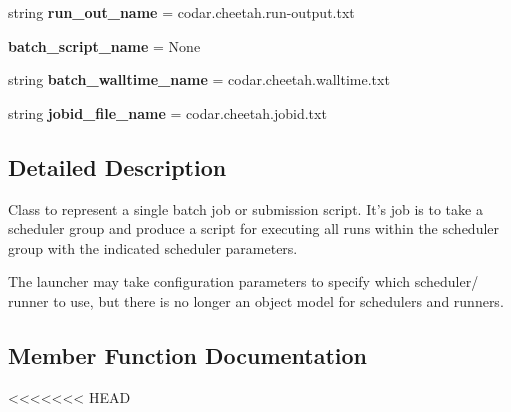 \begin{DoxyCompactItemize}
\item 
\mbox{\label{classcodar_1_1cheetah_1_1launchers_1_1_launcher_a177b178c57aa1f5862b5ce57a7f357d6}} 
string {\bfseries run\+\_\+out\+\_\+name} = \textquotesingle{}codar.\+cheetah.\+run-\/output.\+txt\textquotesingle{}
\item 
\mbox{\label{classcodar_1_1cheetah_1_1launchers_1_1_launcher_af55f3a888f545826d771f3679152da47}} 
{\bfseries batch\+\_\+script\+\_\+name} = None
\item 
\mbox{\label{classcodar_1_1cheetah_1_1launchers_1_1_launcher_abfcb19cb3d329c4ea0f362667f70df2f}} 
string {\bfseries batch\+\_\+walltime\+\_\+name} = \textquotesingle{}codar.\+cheetah.\+walltime.\+txt\textquotesingle{}
\item 
\mbox{\label{classcodar_1_1cheetah_1_1launchers_1_1_launcher_a25b770312bca1ca9b0deefa1faf89c06}} 
string {\bfseries jobid\+\_\+file\+\_\+name} = \textquotesingle{}codar.\+cheetah.\+jobid.\+txt\textquotesingle{}
\end{DoxyCompactItemize}


\subsection{Detailed Description}
\begin{DoxyVerb}Class to represent a single batch job or submission script.
It's job is to take a scheduler group and produce a script for executing
all runs within the scheduler group with the indicated scheduler
parameters.

The launcher may take configuration parameters to specify which scheduler/
runner to use, but there is no longer an object model for schedulers and
runners.
\end{DoxyVerb}
 

\subsection{Member Function Documentation}
<<<<<<< HEAD
\mbox{\label{classcodar_1_1cheetah_1_1launchers_1_1_launcher_a96798b79cb86f858f30dfdff1618bfb3}} 
